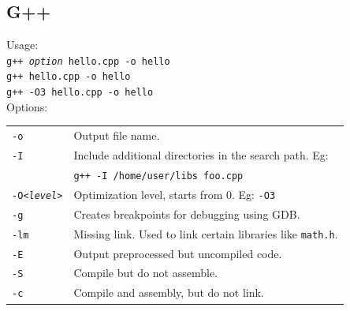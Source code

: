 \subsection{G++}
Usage:\\
\texttt{g++ \textit{option} hello.cpp -o hello}\\
\texttt{g++ hello.cpp -o hello}\\
\texttt{g++ -O3 hello.cpp -o hello}\\
Options:\\
\begin{tabularx}{\linewidth}{lX}
\texttt{-o} & Output file name.\\
\texttt{-I} & Include additional directories in the search path. Eg:\\
& \texttt{g++ -I /home/user/libs foo.cpp}\\
\texttt{-O\textit{<level>}} & Optimization level, starts from 0. Eg: \texttt{-O3}\\
\texttt{-g} & Creates breakpoints for debugging using GDB.\\
\texttt{-lm} & Missing link. Used to link certain libraries like \texttt{math.h}.\\
\texttt{-E} & Output preprocessed but uncompiled code.\\
\texttt{-S} & Compile but do not assemble.\\
\texttt{-c} & Compile and assembly, but do not link.\\
\end{tabularx}

